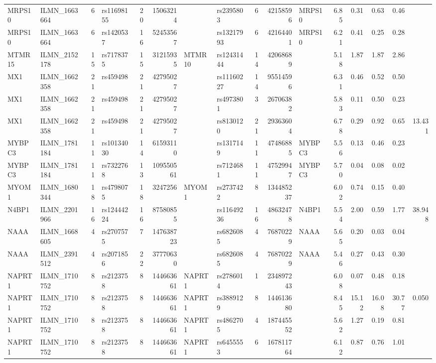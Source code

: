 \documentclass{article}
\begin{document}
\begin{landscape}
{\begin{ThreePartTable}
\begin{longtable}{|llr|lrrl|lrrl|rrrr|r|}
  MRPS10 & ILMN\_1663664 & 6 & rs11698155 & 20 & 15063214 &  & rs2395803 & 6 & 42158596 & MRPS10 & 6.85 & 0.31 & 0.63 & 0.46 &  \\
  MRPS10 & ILMN\_1663664 & 6 & rs1420537 & 16 & 52453567 &  & rs13217993 & 6 & 42164401 & MRPS10 & 6.21 & 0.41 & 0.25 & 0.28 &  \\
  MTMR15 & ILMN\_2152178 & 15 & rs7178375 & 15 & 31215935 & MTMR10 & rs12431444 & 14 & 42068689 &  & 5.18 & 1.87 & 1.87 & 2.86 &  \\
  MX1 & ILMN\_1662358 & 21 & rs459498 & 21 & 42795027 &  & rs11160227 & 14 & 95514596 &  & 6.31 & 0.46 & 0.52 & 0.50 &  \\
  MX1 & ILMN\_1662358 & 21 & rs459498 & 21 & 42795027 &  & rs4973801 & 3 & 26706382 &  & 5.83 & 0.11 & 0.50 & 0.23 &  \\
  MX1 & ILMN\_1662358 & 21 & rs459498 & 21 & 42795027 &  & rs8130120 & 21 & 29363604 &  & 6.78 & 0.29 & 0.92 & 0.65 & 13.431 \\
  MYBPC3 & ILMN\_1781184 & 11 & rs10134030 & 14 & 61593110 &  & rs1317149 & 11 & 47486885 & MYBPC3 & 5.56 & 0.13 & 0.46 & 0.23 &  \\
  MYBPC3 & ILMN\_1781184 & 11 & rs7322768 & 13 & 109550561 &  & rs7124681 & 11 & 47529947 & MYBPC3 & 5.70 & 0.04 & 0.08 & 0.02 &  \\
  MYOM1 & ILMN\_1680344 & 18 & rs4798075 & 18 & 3247256 & MYOM1 & rs2737422 & 8 & 134485237 &  & 6.02 & 0.74 & 0.15 & 0.40 &  \\
  N4BP1 & ILMN\_2201966 & 16 & rs12444224 & 16 & 87580855 &  & rs11649236 & 16 & 48632478 & N4BP1 & 5.54 & 2.00 & 0.59 & 1.77 & 38.948 \\
  NAAA & ILMN\_1668605 & 4 & rs2707575 & 7 & 147638723 &  & rs6826085 & 4 & 76870229 & NAAA & 5.65 & 0.20 & 0.03 & 0.04 &  \\
  NAAA & ILMN\_2391512 & 4 & rs2071856 & 22 & 37770630 &  & rs6826085 & 4 & 76870229 & NAAA & 5.46 & 0.27 & 0.43 & 0.30 &  \\
  NAPRT1 & ILMN\_1710752 & 8 & rs2123758 & 8 & 144663661 & NAPRT1 & rs2786014 & 1 & 234897243 &  & 6.08 & 0.07 & 0.48 & 0.18 &  \\
  NAPRT1 & ILMN\_1710752 & 8 & rs2123758 & 8 & 144663661 & NAPRT1 & rs3889129 & 8 & 144613680 &  & 8.45 & 15.12 & 16.08 & 30.77 & 0.050 \\
  NAPRT1 & ILMN\_1710752 & 8 & rs2123758 & 8 & 144663661 & NAPRT1 & rs4862705 & 4 & 187445552 &  & 5.62 & 1.27 & 0.19 & 0.81 &  \\
  NAPRT1 & ILMN\_1710752 & 8 & rs2123758 & 8 & 144663661 & NAPRT1 & rs6455553 & 6 & 167811764 &  & 6.12 & 0.87 & 0.76 & 1.01 &  \\

\end{longtable}
\end{ThreePartTable}}
\end{landscape}
\end{document}
